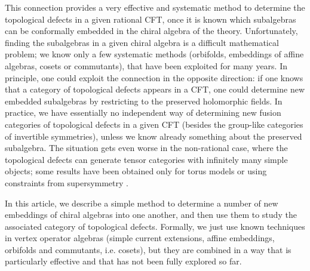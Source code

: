\documentclass[11pt,reqno]{article}
\begin{document}
This connection provides a very effective and systematic method to determine the topological defects in a given rational CFT, once it is known which subalgebras can be conformally embedded in the chiral algebra of the theory. Unfortunately, finding the subalgebras in a given chiral algebra is a difficult mathematical problem; we know only a few systematic methods (orbifolds, embeddings of affine algebras, cosets or commutants), that have been exploited for many years. In principle, one could exploit the connection in the opposite direction: if one knows that a category of topological defects appears in a CFT, one could determine new embedded subalgebras by restricting to the preserved holomorphic fields.  In practice, we have essentially no independent way of determining new fusion categories of topological defects in a given CFT (besides the group-like categories of invertible symmetries), unless we know already something about the preserved subalgebra. The situation gets even worse in the non-rational case, where the topological defects can generate tensor categories with infinitely many simple objects; some results have been obtained only for torus models or using constraints from supersymmetry \cite{Angius:2024evd,Angius:2025zlm,Angius:2025ium}.

In this article, we describe a simple method to determine a number of new embeddings of chiral algebras into one another, and then use them to study the associated category of topological defects. Formally, we just use  known techniques in vertex operator algebras (simple current extensions, affine embeddings, orbifolds and commutants, i.e. cosets), but they are combined in a way that is particularly effective and that has not been fully explored so far.
\end{document}
